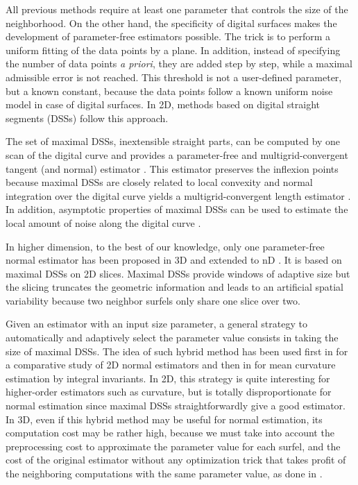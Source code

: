 All previous methods require at least one parameter that controls the size of the neighborhood.
On the other hand, the specificity of digital surfaces makes the development of parameter-free
estimators possible. The trick is to perform a uniform fitting of the data points by a plane.
In addition, instead of specifying the number of data points \emph{a priori}, they are added
step by step, while a maximal admissible error is not reached. This threshold is not a user-defined
parameter, but a known constant, because the data points follow a known uniform noise model
in case of digital surfaces. In 2D, methods based on digital straight segments (DSSs) follow
this approach.

The set of maximal DSSs, \ie inextensible straight parts, can be computed by one scan of the
digital curve \cite{Feschet1999,Feschet2005} and provides a parameter-free and multigrid-convergent
tangent (and normal) estimator \cite{Lachaud2007}.
This estimator preserves the inflexion points because maximal DSSs are closely related to
local convexity \cite{Roussillon2011} and normal integration over the digital curve yields
a multigrid-convergent length estimator \cite{Coeurjolly2004}. 
In addition, asymptotic properties of maximal DSSs can be used to estimate the local amount
of noise along the digital curve \cite{Kerautret2012}.  

In higher dimension, to the best of our knowledge, only one parameter-free normal estimator
has been proposed in 3D \cite{Lenoir1996,Tellier1999} and extended to nD \cite{Lachaud2003}.
It is based on maximal DSSs on 2D slices. Maximal DSSs provide windows of adaptive size
but the slicing truncates the geometric information and leads to
an artificial spatial variability because two neighbor surfels only
share one slice over two. 

Given an estimator with an input size parameter, a general strategy to automatically and adaptively select
the parameter value consists in taking the size of maximal DSSs. 
The idea of such hybrid method has been used first in \cite{Devieilleville2009}
for a comparative study of 2D normal estimators and then in \cite{Coeurjolly2014IIfree}
for mean curvature estimation by integral invariants.
In 2D, this strategy is quite interesting for higher-order estimators such as curvature,
but is totally disproportionate for normal estimation since maximal DSSs straightforwardly give a good estimator. 
In 3D, even if this hybrid method may be useful for normal estimation, its computation cost may be rather high,
because we must take into account the preprocessing cost to approximate the parameter value for each surfel,
and the cost of the original estimator without any optimization trick that takes profit of the neighboring
computations with the same parameter value, as done in \cite{Lachaud2017}. 

